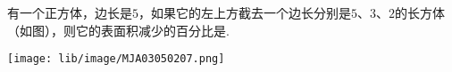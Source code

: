 有一个正方体，边长是$5$，如果它的左上方截去一个边长分别是$5$、$3$、$2$的长方体（如图），则它的表面积减少的百分比是\key{}.
\begin{center}
    \texttt{[image: lib/image/MJA03050207.png]}
\end{center}